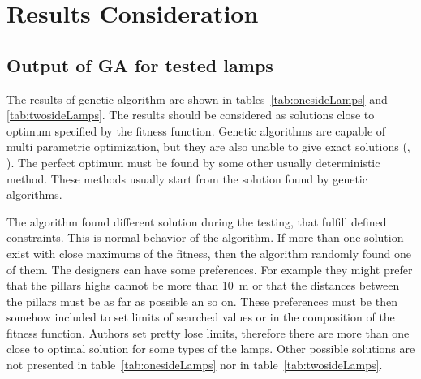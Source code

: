 \section{Results Consideration}
\label{sec:Results}
\subsection{Output of GA for tested lamps}

The results of genetic algorithm are shown in tables~\ref{tab:onesideLamps} and \ref{tab:twosideLamps}. The results should be considered as solutions close to optimum specified by the fitness function. Genetic algorithms are capable of multi parametric optimization, but they are also unable to give exact solutions (\cite{Zelinka2009}, \cite{Fogel2006}). The perfect optimum must be found by some other usually deterministic method. These methods usually start from the solution found by genetic algorithms.

The algorithm found different solution during the testing, that fulfill defined constraints. This is normal behavior of the algorithm. If more than one solution exist with close maximums of the fitness, then the algorithm randomly found one of them. The designers can have some preferences. For example they might prefer that the pillars highs cannot be more than 10~m or that the distances between the pillars must be as far as possible an so on. These preferences must be then somehow included to set limits of searched values or in the composition of the fitness function. Authors set pretty lose limits, therefore there are more than one close to optimal solution for some types of the lamps. Other possible solutions are not presented in table~\ref{tab:onesideLamps} nor in table~\ref{tab:twosideLamps}.
 
